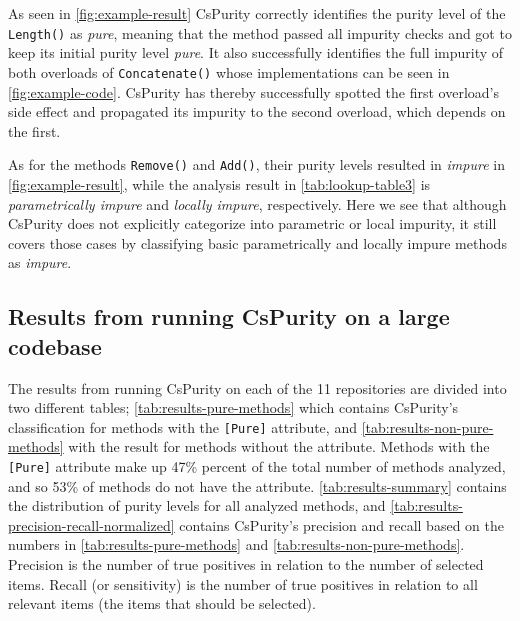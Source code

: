 \documentclass[a4paper,12pt]{article}
\begin{document}
As seen in \autoref{fig:example-result} CsPurity correctly identifies the purity level of the \texttt{Length()} as \textit{pure}, meaning that the method passed all impurity checks and got to keep its initial purity level \textit{pure}. It also successfully identifies the full impurity of both overloads of \texttt{Concatenate()} whose implementations can be seen in \autoref{fig:example-code}. CsPurity has thereby successfully spotted the first overload's side effect and propagated its impurity to the second overload, which depends on the first.

As for the methods \texttt{Remove()} and \texttt{Add()}, their purity levels resulted in \textit{impure} in \autoref{fig:example-result}, while the analysis result in \autoref{tab:lookup-table3} is \textit{parametrically impure} and \textit{locally impure}, respectively. Here we see that although CsPurity does not explicitly categorize into parametric or local impurity, it still covers those cases by classifying basic parametrically and locally impure methods as \textit{impure}.

\subsection{Results from running CsPurity on a large codebase} \label{sub:results-larger-codebase}

The results from running CsPurity on each of the 11 repositories are divided into two different tables; \autoref{tab:results-pure-methods} which contains CsPurity's classification for methods with the \texttt{[Pure]} attribute, and \autoref{tab:results-non-pure-methods} with the result for methods without the attribute. Methods with the \texttt{[Pure]} attribute make up 47\% percent of the total number of methods analyzed, and so 53\% of methods do not have the attribute. \autoref{tab:results-summary} contains the distribution of purity levels for all analyzed methods, and \autoref{tab:results-precision-recall-normalized} contains CsPurity's precision and recall based on the numbers in \autoref{tab:results-pure-methods} and \autoref{tab:results-non-pure-methods}. Precision is the number of true positives in relation to the number of selected items. Recall (or sensitivity) is the number of true positives in relation to all relevant items (the items that should be selected).
\end{document}

